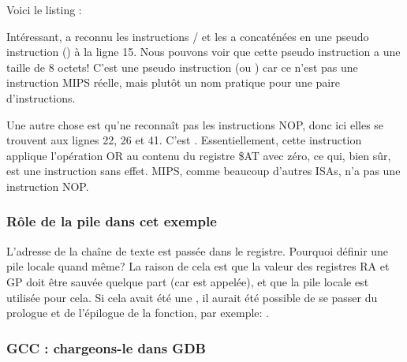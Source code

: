 Voici le listing \IDA:




Intéressant, \IDA a reconnu les instructions / et les a concaténées
en une pseudo instruction  () à la ligne 15.
Nous pouvons voir que cette pseudo instruction a une taille de 8 octets!
C'est une pseudo instruction (ou ) car ce n'est pas une instruction MIPS
réelle, mais plutôt un nom pratique pour une paire d'instructions.


Une autre chose est qu'\IDA ne reconnaît pas les instructions \ac{NOP}, donc ici
elles se trouvent aux lignes 22, 26 et 41.
C'est .
Essentiellement, cette instruction applique l'opération OR au contenu du registre
\$AT avec zéro, ce qui, bien sûr, est une instruction sans effet.
MIPS, comme beaucoup d'autres \ac{ISA}s, n'a pas une instruction \ac{NOP}.

\subsubsection{Rôle de la pile dans cet exemple}

L'adresse de la chaîne de texte est passée dans le registre.
Pourquoi définir une pile locale quand même?
La raison de cela est que la valeur des registres \ac{RA} et GP doit être sauvée
quelque part (car \printf est appelée), et que la pile locale est utilisée pour cela.
Si cela avait été une , il aurait été
possible de se passer du prologue et de l'épilogue de la fonction, par
exemple: .

\subsubsection{GCC \Optimizing: chargeons-le dans GDB}



